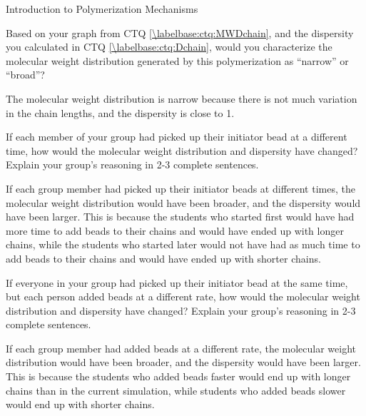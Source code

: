 \begin{activity}{Introduction to Polymerization Mechanisms}
\begin{ctqs}
	\question Based on your graph from CTQ \ref{\labelbase:ctq:MWDchain}, and the dispersity you calculated in CTQ \ref{\labelbase:ctq:Dchain}, would you characterize the molecular weight distribution generated by this polymerization as ``narrow'' or ``broad''?  %
	
		\begin{solution}[1in]
			The molecular weight distribution is narrow because there is not much variation in the chain lengths, and the dispersity is close to 1.
		\end{solution}
	
	\question If each member of your group had picked up their initiator bead at a different time, how would the molecular weight distribution and dispersity have changed?  Explain your group's reasoning in 2-3 complete sentences.
	
		\begin{solution}[1.9in]
			If each group member had picked up their initiator beads at different times, the molecular weight distribution would have been broader, and the dispersity would have been larger.  This is because the students who started first would have had more time to add beads to their chains and would have ended up with longer chains, while the students who started later would not have had as much time to add beads to their chains and would have ended up with shorter chains.
		\end{solution}
	
	\question If everyone in your group had picked up their initiator bead at the same time, but each person added beads at a different rate, how would the molecular weight distribution and dispersity have changed?  Explain your group's reasoning in 2-3 complete sentences.
	
		\begin{solution}[1.9in]
			If each group member had added beads at a different rate, the molecular weight distribution would have been broader, and the dispersity would have been larger.  This is because the students who added beads faster would end up with longer chains than in the current simulation, while students who added beads slower would end up with shorter chains.
		\end{solution}
		
\end{ctqs}

\begin{model}
\label{\labelbase:mdl:stepgrowth}


\end{model}
\end{activity}
